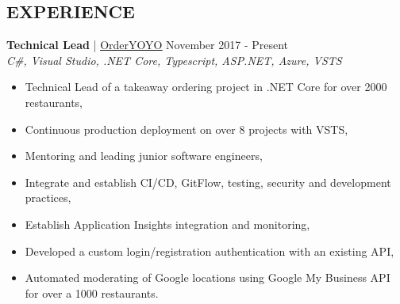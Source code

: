 \documentclass[margin, 10pt, hidelinks]{res} %
\newcommand{\emphasize}{\large\bfseries} %
\begin{document}
\begin{resume}





		


\section{EXPERIENCE}

{\emphasize Technical Lead} | \href{https://orderyoyo.com/}{\underline{OrderYOYO}}    \hfill November 2017 - Present  \\
{\it C\#, Visual Studio, .NET Core, Typescript, ASP.NET, Azure, VSTS} %
\begin{itemize} \setlength{\itemindent}{-0.1in}\itemsep 0pt %
\item Technical Lead of a takeaway ordering project in .NET Core for over 2000 restaurants,
\item Continuous production deployment on over 8 projects with VSTS,
\item Mentoring and leading junior software engineers,
\item Integrate and establish  CI/CD, GitFlow, testing, security and development practices,
\item Establish Application Insights integration and monitoring,
\item Developed a custom login/registration authentication with an existing API,
\item Automated moderating of Google locations using Google My Business API for over a 1000 restaurants.
\end{itemize}


\end{resume}
\end{document}
